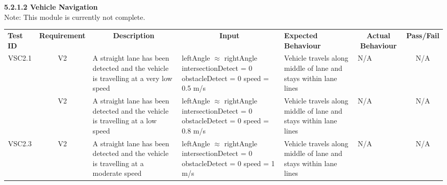 \documentclass [10pt]{article}
\begin{document}
    
    
    
    
    
    \textbf{5.2.1.2 Vehicle Navigation} \vspace{2mm}\\
    Note: This module is currently not complete. \\
 \begin{longtable}{ | p{ } | p{ } |  p{ } |  p{ } | p{ } | p{ } |  p{ } |}  \hline

    \rowcolor{subsectionC}\textbf{Test ID}  
    & \textbf{Requirement}
    & \multicolumn{1}{c|}{\textbf{Description} }
    & \multicolumn{1}{c|}{\textbf{Input} }
    & \textbf{Expected Behaviour} 
    & \multicolumn{1}{c|}{\textbf{Actual Behaviour}}
    & \textbf{Pass/Fail} \\    
    
    \multicolumn{1}{|c|}{VSC2.1} 
    & \multicolumn{1}{c|}{V2}
    & A straight lane has been detected and the vehicle is travelling at a very low speed
    & leftAngle $\approx$ rightAngle \newline
    intersectionDetect = 0 \newline
    obstacleDetect = 0 \newline
    speed = 0.5 m/s
    & Vehicle travels along middle of lane and stays within lane lines
    & N/A
    & \multicolumn{1}{c|}{N/A}\\ 
    
    \rowcolor{tableCell}\multicolumn{1}{|c|}{VSC2.2} 
    & \multicolumn{1}{c|}{V2}
    & A straight lane has been detected and the vehicle is travelling at a low speed
    & leftAngle $\approx$ rightAngle \newline
    intersectionDetect = 0 \newline
    obstacleDetect = 0 \newline
    speed =  0.8 m/s
    & Vehicle travels along middle of lane and stays within lane lines
    & N/A 
    & \multicolumn{1}{c|}{N/A}\\ 
    
    \multicolumn{1}{|c|}{VSC2.3}
    & \multicolumn{1}{c|}{V2}
    & A straight lane has been detected and the vehicle is travelling at a moderate speed
    & leftAngle $\approx$ rightAngle \newline
    intersectionDetect = 0 \newline
    obstacleDetect = 0 \newline
    speed = 1 m/s
    & Vehicle travels along middle of lane and stays within lane lines
    & N/A
    & \multicolumn{1}{c|}{N/A}\\
    

\end{longtable}
\end{document}
